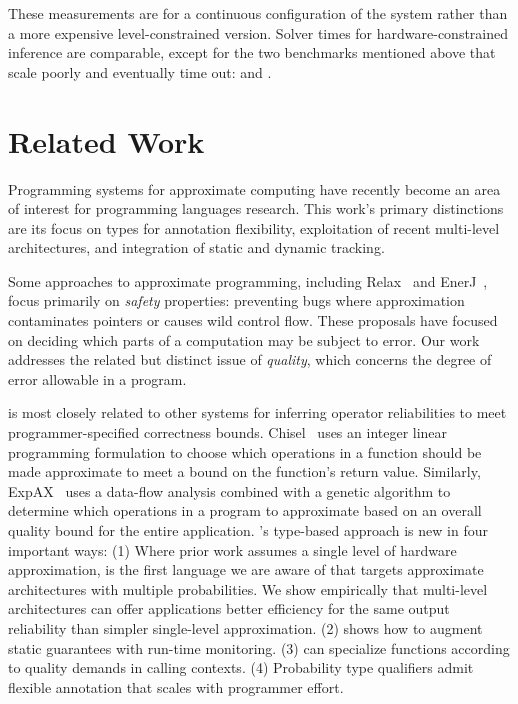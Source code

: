 These measurements are for a continuous configuration of the system rather
than a more expensive level-constrained version.
Solver times for hardware-constrained inference are comparable, except for the
two benchmarks mentioned above that scale poorly and eventually time out:
 and .




\section{Related Work}

Programming systems for approximate computing have recently become an area of
interest for programming languages research.
This work's primary distinctions are its focus on types for annotation
flexibility,
exploitation of recent multi-level architectures,
and integration of static and dynamic tracking.

Some approaches to approximate programming, including Relax~\cite{relax}
and EnerJ~\cite{enerj}, focus primarily on \emph{safety} properties:
preventing bugs where approximation contaminates pointers or causes wild
control flow.
These proposals have focused on deciding which parts of a computation may be
subject to error.
Our work addresses the related but distinct issue of \emph{quality}, which
concerns the degree of error allowable in a program.

\lang is most closely related to other systems for inferring operator
reliabilities to meet program\-mer-specified correctness bounds.
Chisel~\cite{chisel} uses an integer linear programming formulation
to choose which operations in a function should be made approximate to
meet a bound on the function's return value.
Similarly, ExpAX~\cite{expax-tr} uses a data-flow analysis combined with a
genetic algorithm to determine which operations in a program to approximate
based on an overall quality bound for the entire application.
\lang's type-based approach is new in four important ways:
(1) Where prior work assumes a single level of hardware approximation, \lang
is the first language we are aware of that targets approximate architectures
with multiple probabilities.
We show empirically that multi-level architectures can offer applications
better efficiency for the same output reliability than simpler single-level
approximation.
(2) \lang shows how to augment static guarantees with run-time monitoring.
(3) \lang can specialize functions according to quality demands in calling
contexts.
(4) Probability type qualifiers admit flexible annotation that scales with
programmer effort.


